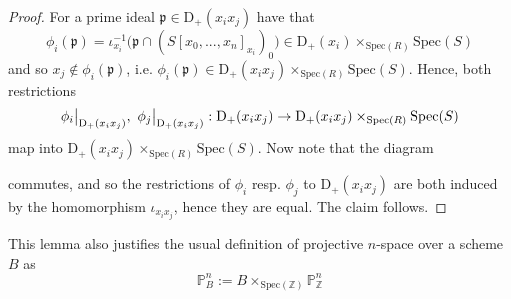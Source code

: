 \documentclass{scrartcl}
\newcommand{\Z}{\mathbb{Z}}
\newcommand{\D}[1]{\mathrm{D}_+(#1)}
\renewcommand{\P}{\mathbb{P}}
\newcommand{\p}{\mathfrak{p}}
\newcommand{\Spec}{\mathrm{Spec}}
\newcommand\restr[2]{{
    \left.\kern-\nulldelimiterspace
    #1
    \vphantom{\big|}
    \right|_{#2}
}}
\theoremstyle{definition}
\begin{document}
\begin{proof}
    For a prime ideal $\p \in \D{x_ix_j}$ have that
    \begin{equation*}
        \phi_i(\p) = \iota_{x_i}^{-1}\bigl( \p \cap (S[x_0, ..., x_n]_{x_i})_0 \bigr) \in \D{x_i} \times_{\Spec(R)} \Spec(S)
    \end{equation*}
    and so $x_j \notin \phi_i(\p)$, i.e. $\phi_i(\p) \in \D{x_ix_j} \times_{\Spec(R)} \Spec(S)$.
    Hence, both restrictions
    \begin{equation*}
        \restr{\phi_i}{\D{x_ix_j}}, \ \restr{\phi_j}{\D{x_ix_j}}: \D{x_ix_j} \to \D{x_ix_j} \times_{\Spec(R)} \Spec(S)
    \end{equation*}
    map into $\D{x_ix_j} \times_{\Spec(R)} \Spec(S)$.
    Now note that the diagram
    \begin{center}
    \end{center}
    commutes, and so the restrictions of $\phi_i$ resp. $\phi_j$ to $\D{x_ix_j}$ are both induced by the homomorphism $\iota_{x_ix_j}$, hence they are equal.
    The claim follows.
\end{proof}
This lemma also justifies the usual definition of projective $n$-space over a scheme $B$ as
\begin{equation*}
    \P_B^n := B \times_{\Spec(\Z)} \P_\Z^n
\end{equation*}
\end{document}
